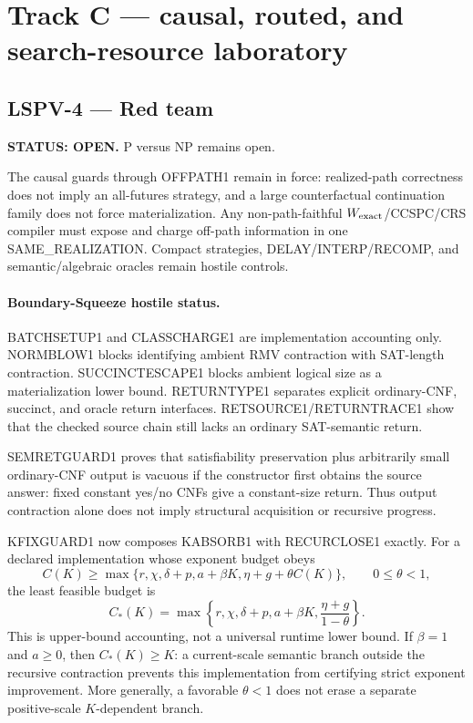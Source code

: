 \documentclass[11pt]{article}
\begin{document}
\section{Track C --- causal, routed, and search-resource laboratory}

\subsection{LSPV-4 --- Red team}
\textbf{STATUS: OPEN.} P versus NP remains open.

The causal guards through OFFPATH1 remain in force: realized-path correctness does not imply an all-futures strategy, and a large counterfactual continuation family does not force materialization. Any non-path-faithful \(W_{\rm exact}\)/CCSPC/CRS compiler must expose and charge off-path information in one SAME\_REALIZATION. Compact strategies, DELAY/INTERP/RECOMP, and semantic/algebraic oracles remain hostile controls.

\paragraph{Boundary-Squeeze hostile status.}
BATCHSETUP1 and CLASSCHARGE1 are implementation accounting only. NORMBLOW1 blocks identifying ambient RMV contraction with SAT-length contraction. SUCCINCTESCAPE1 blocks ambient logical size as a materialization lower bound. RETURNTYPE1 separates explicit ordinary-CNF, succinct, and oracle return interfaces. RETSOURCE1/RETURNTRACE1 show that the checked source chain still lacks an ordinary SAT-semantic return.

SEMRETGUARD1 proves that satisfiability preservation plus arbitrarily small ordinary-CNF output is vacuous if the constructor first obtains the source answer: fixed constant yes/no CNFs give a constant-size return. Thus output contraction alone does not imply structural acquisition or recursive progress.

KFIXGUARD1 now composes KABSORB1 with RECURCLOSE1 exactly. For a declared implementation whose exponent budget obeys
\[
C(K)\ge\max\{r,\chi,\delta+p,a+\beta K,\eta+g+\theta C(K)\},
\qquad 0\le\theta<1,
\]
the least feasible budget is
\[
\boxed{
C_*(K)=
\max\left\{
r,\chi,\delta+p,a+\beta K,
\frac{\eta+g}{1-\theta}
\right\}.
}
\]
This is upper-bound accounting, not a universal runtime lower bound. If \(\beta=1\) and \(a\ge0\), then \(C_*(K)\ge K\): a current-scale semantic branch outside the recursive contraction prevents this implementation from certifying strict exponent improvement. More generally, a favorable \(\theta<1\) does not erase a separate positive-scale \(K\)-dependent branch.
\end{document}
